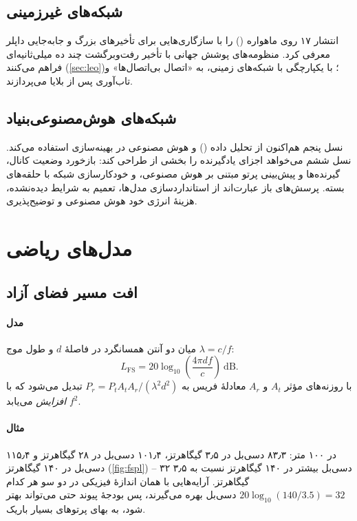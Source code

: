 \documentclass[11pt,a4paper]{article}
\begin{document}
\subsection{شبکه‌های غیرزمینی}
انتشار ۱۷  روی ماهواره () را با سازگاری‌هایی برای تأخیرهای بزرگ و جابه‌جایی داپلر معرفی کرد. منظومه‌های  پوشش جهانی با
تأخیر رفت‌وبرگشت چند ده میلی‌ثانیه‌ای فراهم می‌کنند (\cref{sec:leo})؛ با یکپارچگی با شبکه‌های زمینی، به «اتصال بی‌اتصال‌ها» و تاب‌آوری پس از بلایا
می‌پردازند.

\subsection{شبکه‌های هوش‌مصنوعی‌بنیاد}
نسل پنجم هم‌اکنون از تحلیل داده () و هوش مصنوعی در بهینه‌سازی  استفاده می‌کند. نسل ششم می‌خواهد اجزای یادگیرنده را بخشی از طراحی
کند: بازخورد وضعیت کانال، گیرنده‌ها و پیش‌بینی پرتو مبتنی بر هوش مصنوعی، و خودکارسازی شبکه با حلقه‌های بسته. پرسش‌های باز عبارت‌اند از استانداردسازی
مدل‌ها، تعمیم به شرایط دیده‌نشده، هزینهٔ انرژی خود هوش مصنوعی و توضیح‌پذیری.

\section{مدل‌های ریاضی}

\subsection{افت مسیر فضای آزاد}\label{sec:fspl}
\paragraph{مدل} میان دو آنتن همسانگرد در فاصلهٔ $d$ و طول موج $\lambda = c/f$:
\begin{equation}\label{eq:fspl}
  L_{\mathrm{FS}} = 20\log_{10}\!\left(\frac{4\pi d f}{c}\right) \ \mathrm{dB}.
\end{equation}
با روزنه‌های مؤثر $A_t$ و $A_r$ معادلهٔ فریس به $P_r = P_t A_t A_r/(\lambda^2 d^2)$ تبدیل می‌شود که با $f^2$ \emph{افزایش} می‌یابد.
\paragraph{مثال} در ۱۰۰ متر: ۸۳٫۳ دسی‌بل در ۳٫۵ گیگاهرتز، ۱۰۱٫۴ دسی‌بل در ۲۸ گیگاهرتز و ۱۱۵٫۴ دسی‌بل در ۱۴۰ گیگاهرتز (\cref{fig:fspl}) -- ۳۲ دسی‌بل بیشتر در
۱۴۰ گیگاهرتز نسبت به ۳٫۵ گیگاهرتز. آرایه‌هایی با همان اندازهٔ فیزیکی در دو سو هر کدام $20\log_{10}(140/3.5) = 32$ دسی‌بل بهره می‌گیرند، پس بودجهٔ پیوند حتی
می‌تواند بهتر شود، به بهای پرتوهای بسیار باریک.
\end{document}
